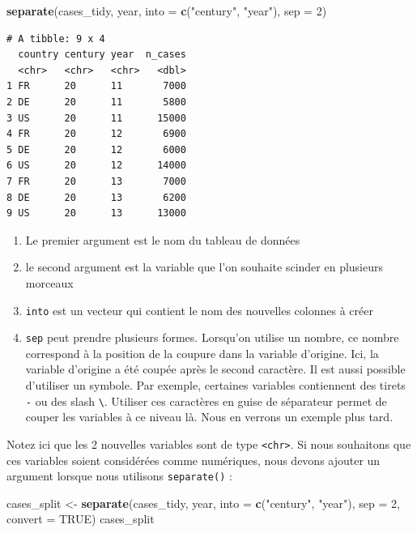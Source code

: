 \documentclass[a4paperpaper,]{article}
\newenvironment{Shaded}{\begin{snugshade}}{\end{snugshade}}
\newcommand{\KeywordTok}[1]{\textcolor[rgb]{0.13,0.29,0.53}{\textbf{#1}}}
\newcommand{\DataTypeTok}[1]{\textcolor[rgb]{0.13,0.29,0.53}{#1}}
\newcommand{\DecValTok}[1]{\textcolor[rgb]{0.00,0.00,0.81}{#1}}
\newcommand{\StringTok}[1]{\textcolor[rgb]{0.31,0.60,0.02}{#1}}
\newcommand{\OtherTok}[1]{\textcolor[rgb]{0.56,0.35,0.01}{#1}}
\newcommand{\NormalTok}[1]{#1}
\providecommand{\tightlist}{%
  \setlength{\itemsep}{0pt}\setlength{\parskip}{0pt}}
\theoremstyle{definition}
\theoremstyle{definition}
\theoremstyle{definition}
\theoremstyle{remark}
\begin{document}
\begin{Shaded}
\begin{Highlighting}[]
\KeywordTok{separate}\NormalTok{(cases_tidy, year, }\DataTypeTok{into =} \KeywordTok{c}\NormalTok{(}\StringTok{"century"}\NormalTok{, }\StringTok{"year"}\NormalTok{), }\DataTypeTok{sep =} \DecValTok{2}\NormalTok{)}
\end{Highlighting}
\end{Shaded}

\begin{verbatim}
# A tibble: 9 x 4
  country century year  n_cases
  <chr>   <chr>   <chr>   <dbl>
1 FR      20      11       7000
2 DE      20      11       5800
3 US      20      11      15000
4 FR      20      12       6900
5 DE      20      12       6000
6 US      20      12      14000
7 FR      20      13       7000
8 DE      20      13       6200
9 US      20      13      13000
\end{verbatim}

\begin{enumerate}
\def\labelenumi{\arabic{enumi}.}
\tightlist
\item
  Le premier argument est le nom du tableau de données
\item
  le second argument est la variable que l'on souhaite scinder en
  plusieurs morceaux
\item
  \texttt{into} est un vecteur qui contient le nom des nouvelles
  colonnes à créer
\item
  \texttt{sep} peut prendre plusieurs formes. Lorsqu'on utilise un
  nombre, ce nombre correspond à la position de la coupure dans la
  variable d'origine. Ici, la variable d'origine a été coupée après le
  second caractère. Il est aussi possible d'utiliser un symbole. Par
  exemple, certaines variables contiennent des tirets \texttt{-} ou des
  slash \texttt{\textbackslash{}}. Utiliser ces caractères en guise de
  séparateur permet de couper les variables à ce niveau là. Nous en
  verrons un exemple plus tard.
\end{enumerate}

Notez ici que les 2 nouvelles variables sont de type
\texttt{\textless{}chr\textgreater{}}. Si nous souhaitons que ces
variables soient considérées comme numériques, nous devons ajouter un
argument lorsque nous utilisons \texttt{separate()} :

\begin{Shaded}
\begin{Highlighting}[]
\NormalTok{cases_split <-}\StringTok{ }\KeywordTok{separate}\NormalTok{(cases_tidy, year, }\DataTypeTok{into =} \KeywordTok{c}\NormalTok{(}\StringTok{"century"}\NormalTok{, }\StringTok{"year"}\NormalTok{), }\DataTypeTok{sep =} \DecValTok{2}\NormalTok{, }\DataTypeTok{convert =} \OtherTok{TRUE}\NormalTok{)}
\NormalTok{cases_split}
\end{Highlighting}
\end{Shaded}
\end{document}

